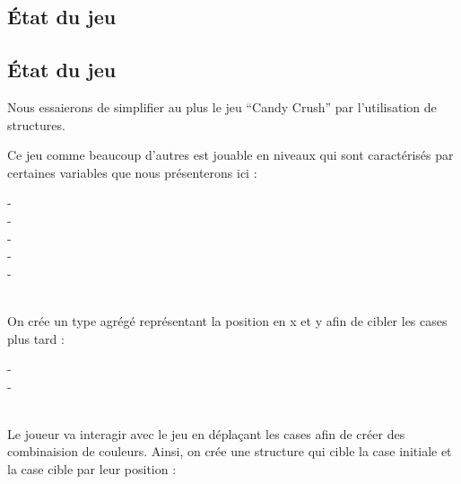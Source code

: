 \subsection{État du jeu}

\subsection{État du jeu}
Nous essaierons de simplifier au plus le jeu ``Candy Crush'' par l'utilisation de structures.\smallskip

Ce jeu comme beaucoup d'autres est jouable en niveaux qui sont caractérisés par certaines variables que nous présenterons ici : \\


\begin{typeag}[Niveau]
 -       \\
 -       \\
 -       \\
 -       \\
 -       
  \end{typeag}		\\
  
  On crée un type agrégé représentant la position en x et y afin de cibler les cases plus tard : \\
  
  \begin{typeag}[Position]
 -       \\
 -       
  \end{typeag}	\\
  
  Le joueur va interagir avec le jeu en déplaçant les cases afin de créer des combinaision de couleurs.
  Ainsi, on crée une structure qui cible la case initiale et la case cible par leur position : \\
  
